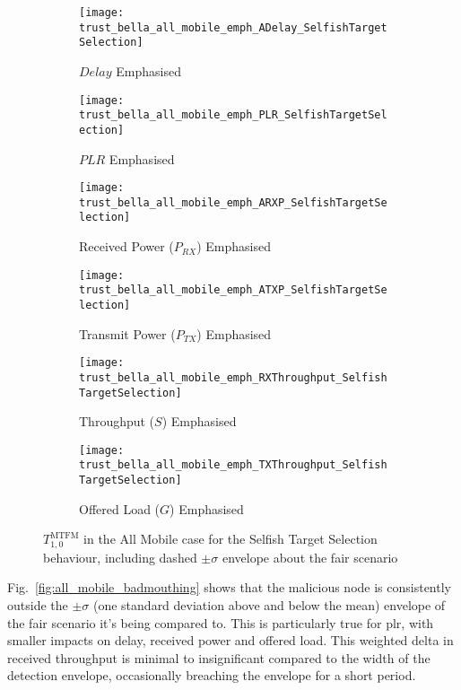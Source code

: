 %
\begin{figure}[h]
	\centering
	\begin{subfigure}{0.45\textwidth}	
		\texttt{[image: trust\_bella\_all\_mobile\_emph\_ADelay\_SelfishTargetSelection]} 
		\caption{$Delay$ Emphasised}
		\label{fig:all_mobile_selfish_delay}
	\end{subfigure}
	\begin{subfigure}{0.45\textwidth}	
		\texttt{[image: trust\_bella\_all\_mobile\_emph\_PLR\_SelfishTargetSelection]}
		\caption{$PLR$ Emphasised}
		\label{fig:all_mobile_selfish_plr}
	\end{subfigure}
	
	\begin{subfigure}{0.45\textwidth}	
		\texttt{[image: trust\_bella\_all\_mobile\_emph\_ARXP\_SelfishTargetSelection]}
		\caption{Received Power ($P_{RX}$) Emphasised}
		\label{fig:all_mobile_selfish_rxp}
	\end{subfigure}
	\begin{subfigure}{0.45\textwidth}
		\texttt{[image: trust\_bella\_all\_mobile\_emph\_ATXP\_SelfishTargetSelection]}
		\caption{Transmit Power ($P_{TX}$) Emphasised}
		\label{fig:all_mobile_selfish_txp}
	\end{subfigure}
	
	\begin{subfigure}{0.45\textwidth}
		\texttt{[image: trust\_bella\_all\_mobile\_emph\_RXThroughput\_SelfishTargetSelection]} 
		\caption{Throughput ($S$) Emphasised}
		\label{fig:all_mobile_selfish_rxthroughput}
	\end{subfigure}
	\begin{subfigure}{0.45\textwidth}
		\texttt{[image: trust\_bella\_all\_mobile\_emph\_TXThroughput\_SelfishTargetSelection]} 
		\caption{Offered Load ($G$) Emphasised}
		\label{fig:all_mobile_selfish_txthroughput}
	\end{subfigure}
	\caption{$T_{1,0}^\text{MTFM}$ in the All Mobile case for the Selfish Target Selection behaviour, including dashed $\pm\sigma$ envelope about the fair scenario}
	\label{fig:all_mobile_selfish}
\end{figure}


Fig.~\ref{fig:all_mobile_badmouthing} shows that the malicious node is consistently outside the $\pm\sigma$ (one standard deviation above and below the mean) envelope of the fair scenario it's being compared to.
This is particularly true for \gls{plr}, with smaller impacts on delay, received power and offered load. 
This weighted delta in received throughput is minimal to insignificant compared to the width of the detection envelope, occasionally breaching the envelope for a short period. 

